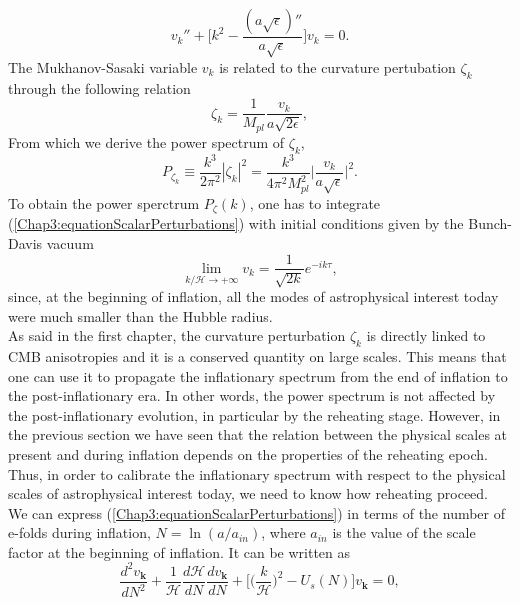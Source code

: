 \documentclass[11pt,a4paper,twoside]{book}
\begin{document}
 \begin{equation}
\label{Chap3:equationScalarPerturbations}
v_{k}'' + \Bigg[k^{2} - \frac{(a\sqrt{\epsilon})''}{a\sqrt{\epsilon}}\Bigg]v_{k}=0.
 \end{equation}
The Mukhanov-Sasaki variable $ v_{k} $ is related to the curvature pertubation $\zeta_{k}$ through the following relation
\begin{equation}
	\label{Chap3:Zetak}
	\zeta_{k} = \frac{1}{M_{pl}}\frac{v_{k}}{a\sqrt{2\epsilon}},
\end{equation}
From which we derive the power spectrum of $ \zeta_{k} $,
\begin{equation}
	\label{Chap3:PowerSpectrum}
	P_{\zeta_{k}} \equiv \frac{k^{3}}{2\pi^{2}}|\zeta_{k}|^{2}=\frac{k^{3}}{4\pi^{2}M_{pl}^{2}}\Bigg|\frac{v_{k}}{a\sqrt{\epsilon}}\Bigg|^{2}.
\end{equation}
To obtain the power sperctrum $ P_{\zeta}(k) $, one has to integrate (\ref{Chap3:equationScalarPerturbations}) with initial conditions given by the Bunch-Davis vacuum 
\begin{equation}
	\label{Chap3:BunchDavis}
	\lim_{k/\mathcal{H} \rightarrow +\infty} v_{k} = \frac{1}{\sqrt{2k}}e^{-ik\tau},
\end{equation}
since, at the beginning of inflation, all the modes of astrophysical interest today were much smaller than the Hubble radius.\\
As said in the first chapter, the curvature perturbation $\zeta_{k}$ is directly linked to CMB anisotropies and it is a conserved quantity on large scales. This means that one can use it to propagate the inflationary spectrum from the end of inflation to the post-inflationary era. In other words, the power spectrum is not affected by the post-inflationary evolution, in particular by the reheating stage. However, in the previous section we have seen that the relation between the physical scales at present and during inflation depends on the properties of the reheating epoch. Thus, in order to calibrate the inflationary spectrum with respect to the physical scales of astrophysical interest today, we need to know how reheating proceed.\\
We can express (\ref{Chap3:equationScalarPerturbations}) in terms of the number of e-folds during inflation, $ N=\ln (a/a_{in}) $, where $ a_{in} $ is the value of the scale factor at the beginning of inflation. It can be written as 
\begin{equation}
\label{Chap3:scalarPerturbation}
\frac{d^{2} v_{\textbf{k}}}{dN^{2}} + \frac{1}{\mathcal{H}}\frac{d\mathcal{H}}{dN}\frac{dv_{\textbf{k}}}{dN} + \Bigg[\Bigg(\frac{k}{\mathcal{H}}\Bigg)^{2}-U_{s}(N)\Bigg]v_{\textbf{k}}=0,
\end{equation}
\end{document}
